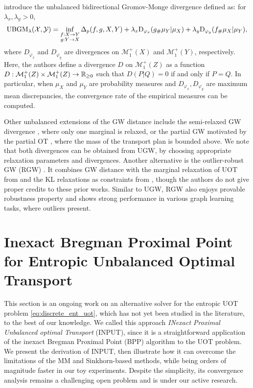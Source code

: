 \citep{Zhang21} introduce the unbalanced bidirectional Gromov-Monge divergence defined as:
for $\lambda_x, \lambda_y > 0$,
\begin{align}
    \text{UBGM}_{\lambda}(\mathcal X, \mathcal Y) = \inf_{\substack{f: X \to Y \\ g: Y \to X}}
  \Delta_p(f,g, X, Y) + \lambda_x \text{D}_{\varphi_x}(g_{\#} \mu_Y | \mu_X)
  + \lambda_y \text{D}_{\varphi_y}(f_{\#}\mu_X | \mu_Y),
\end{align}
where $D_{\varphi_x}$ and $D_{\varphi_y}$ are divergences on $\mathcal M^+_1(X)$ and $\mathcal M^+_1(Y)$,
respectively. Here, the authors define a divergence $D$ on $\mathcal M^+_1(Z)$ as a function
$D: \mathcal M^+_1(Z) \times \mathcal M^+_1(Z) \to \mathbb R_{\geq 0}$ such that
$D(P | Q) = 0$ if and only if $P = Q$. In particular, when $\mu_X$ and $\mu_Y$
are probability measures and $D_{\varphi_x}, D_{\varphi_y}$ are maximum mean discrepancies,
the convergence rate of the empirical measures can be computed.

Other unbalanced extensions of the GW distance include the semi-relaxed GW divergence \citep{Vincent22},
where only one marginal is relaxed, or the partial GW \citep{Chapel20}
motivated by the partial OT \citep{Caffarelli10, Figalli10}, where the mass of the transport plan
is bounded above. We note that both divergences can be obtained from UGW,
by choosing appropriate relaxation parameters and divergences.
Another alternative is the outlier-robust GW (RGW) \citep{Kong23}. It combines GW distance with
the marginal relaxation of UOT from \citep{Liero18} and
the KL relaxations as constraints from \citep{Balaji20},
though the authors do not give proper credits to these prior works.
Similar to UGW, RGW also enjoys provable robustness property and shows strong performance
in various graph learning tasks, where outliers present.

\section{Inexact Bregman Proximal Point for Entropic Unbalanced Optimal Transport}
\label{sec:input}

This section is an ongoing work on an alternative solver for the entropic UOT problem
\ref{eq:discrete_ent_uot}, which has not yet been studied in the literature,
to the best of our knowledge.
We called this approach \textit{INexact Proximal Unbalanced optimal Transport} (INPUT),
since it is a straightforward application of the inexact Bregman Proximal Point (BPP) algorithm
to the UOT problem. We present the derivation of INPUT, then illustrate how
it can overcome the limitations of the MM and Sinkhorn-based methods,
while being orders of magnitude faster in our toy experiments. Despite the simplicity,
its convergence analysis remains a challenging open problem and is under our active research.

